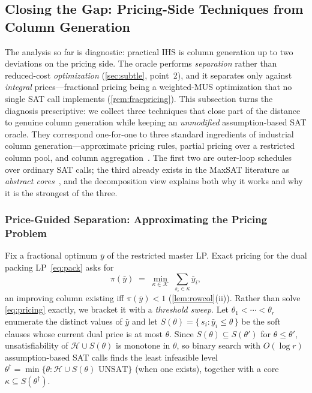 \subsection{Closing the Gap: Pricing-Side Techniques from Column Generation}
\label{sec:cg-gap}

The analysis so far is diagnostic: practical IHS is column generation up to
two deviations on the pricing side. The oracle performs \emph{separation}
rather than reduced-cost \emph{optimization} (\cref{sec:subtle}, point~2),
and it separates only against \emph{integral} prices---fractional pricing
being a weighted-MUS optimization that no single SAT call implements
(\cref{rem:fracpricing}). This subsection turns the diagnosis prescriptive:
we collect three techniques that close part of the distance to genuine
column generation while keeping an \emph{unmodified} assumption-based SAT
oracle. They correspond one-for-one to three standard ingredients of
industrial column generation---approximate pricing rules, partial pricing
over a restricted column pool, and column
aggregation~\citep{desaulniers2005column}. The first two are outer-loop
schedules over ordinary SAT calls; the third already exists in the MaxSAT
literature as \emph{abstract cores}~\citep{berg2020abstract}, and the
decomposition view explains both why it works and why it is the strongest
of the three.

\subsubsection{Price-Guided Separation: Approximating the Pricing Problem}
\label{sec:price-guided}

Fix a fractional optimum $\bar y$ of the restricted master LP. Exact
pricing for the dual packing LP~\eqref{eq:pack} asks for
\begin{equation}
\pi(\bar y) \;=\; \min_{\kappa \in \mathcal{K}} \; \sum_{s_i \in \kappa} \bar y_i,
\label{eq:pricing}
\end{equation}
an improving column existing iff $\pi(\bar y) < 1$
(\cref{lem:rowcol}(ii)). Rather than solve \eqref{eq:pricing} exactly, we
bracket it with a \emph{threshold sweep}. Let $\theta_1 < \cdots < \theta_r$
enumerate the distinct values of $\bar y$ and let
$S(\theta) = \{\, s_i : \bar y_i \le \theta \,\}$ be the soft clauses whose
current dual price is at most $\theta$. Since $S(\theta) \subseteq
S(\theta')$ for $\theta \le \theta'$, unsatisfiability of $\mathcal{H} \cup
S(\theta)$ is monotone in $\theta$, so binary search with $O(\log r)$
assumption-based SAT calls finds the least infeasible level
$\theta^\dagger = \min\{\theta : \mathcal{H} \cup S(\theta) \text{ UNSAT}\}$
(when one exists), together with a core $\kappa \subseteq
S(\theta^\dagger)$.

